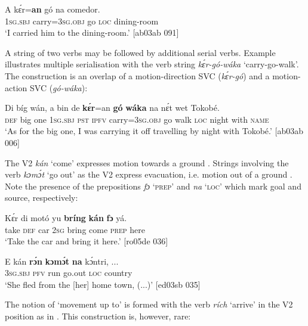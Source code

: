 \ea%
    \label{ex:key:1544}
    \gll A    kɛ́r=\textbf{an}      gó  na  comedor.\\
\textsc{1sg.sbj}  carry=\textsc{3sg.obj}    go  \textsc{loc}  dining-room\\

\glt ‘I carried him to the dining-room.’ [ab03ab 091]
\z

A string of two verbs may be followed by additional serial verbs. Example  illustrates multiple serialisation{\fff} with the verb string \textit{kɛ́r-gó-wáka} ‘carry-go-walk’. The construction is an overlap of a motion-direction SVC (\textit{kɛ́r-gó}) and a motion-action SVC (\textit{gó-wáka}): 


\ea%
    \label{ex:key:1545}
    \gll Di  bíg  wán,  a    bin  de  \textbf{kɛ́r}=an    \textbf{gó}  \textbf{wáka}
na  nɛ́t    wet    Tokobé. \\
\textsc{def}  big  one    \textsc{1sg.sbj}  \textsc{pst}  \textsc{ipfv}  carry=\textsc{3sg.obj}  go  walk
\textsc{loc}  night  with    \textsc{name}\\

\glt ‘As for the big one, I was carrying it off travelling by night with Tokobé.’ [ab03ab 006]
\z

The V2 \textit{kán} ‘come’ expresses motion towards a ground . Strings involving the verb \textit{kɔmɔ́t} ‘go out’ as the V2 express evacuation, i.e. motion out of a ground . Note the presence of the prepositions \textit{fɔ} ‘\textsc{prep’} and \textit{na} ‘\textsc{loc’} which mark goal and source,\index{} respectively:


\ea%
    \label{ex:key:1546}
    \gll Kɛ́r    di  motó  yu  \textbf{bríng}  \textbf{kán}    \textbf{fɔ}  yá.\\
take    \textsc{def}  car    \textsc{2sg}  bring  come  \textsc{prep}  here\\

\glt ‘Take the car and bring it here.’ [ro05de 036]
\z


\ea%
    \label{ex:key:1547}
    \gll E    kán  \textbf{rɔ́n}  \textbf{kɔmɔ́t}  \textbf{na} kɔ́ntri,    \op...\cp{}\\
\textsc{3sg.sbj}  \textsc{pfv}  run  go.out  \textsc{loc}  country\\

\glt ‘She fled from the [her] home town, (...)’ [ed03sb 035]
\z

The notion of ‘movement up to’ is formed with the verb \textit{rích} ‘arrive’ in the V2 position as in . This construction is, however, rare: 


